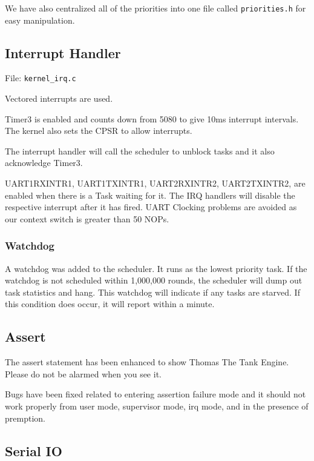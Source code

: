 \documentclass[letterpaper]{article}
\begin{document}
We have also centralized all of the priorities into one file called \texttt{priorities.h} for easy manipulation.


\subsection{Interrupt Handler%
  \label{interrupt-handler}%
}

File: \texttt{kernel\_irq.c}

Vectored interrupts are used.

Timer3 is enabled and counts down from 5080 to give 10ms interrupt intervals. The kernel also sets the CPSR to allow interrupts.

The interrupt handler will call the scheduler to unblock tasks and it also acknowledge Timer3.

UART1RXINTR1, UART1TXINTR1, UART2RXINTR2, UART2TXINTR2, are enabled when there is a Task waiting for it. The IRQ handlers will disable the respective interrupt after it has fired. UART Clocking problems are avoided as our context switch is greater than 50 NOPs.


\subsubsection{Watchdog%
  \label{watchdog}%
}

A watchdog was added to the scheduler. It runs as the lowest priority task. If the watchdog is not scheduled within 1,000,000 rounds, the scheduler will dump out task statistics and hang. This watchdog will indicate if any tasks are starved. If this condition does occur, it will report within a minute.


\subsection{Assert%
  \label{assert}%
}

The assert statement has been enhanced to show Thomas The Tank Engine. Please do not be alarmed when you see it.

Bugs have been fixed related to entering assertion failure mode and it should not work properly from user mode, supervisor mode, irq mode, and in the presence of premption.


\subsection{Serial IO%
  \label{serial-io}%
}
\end{document}
